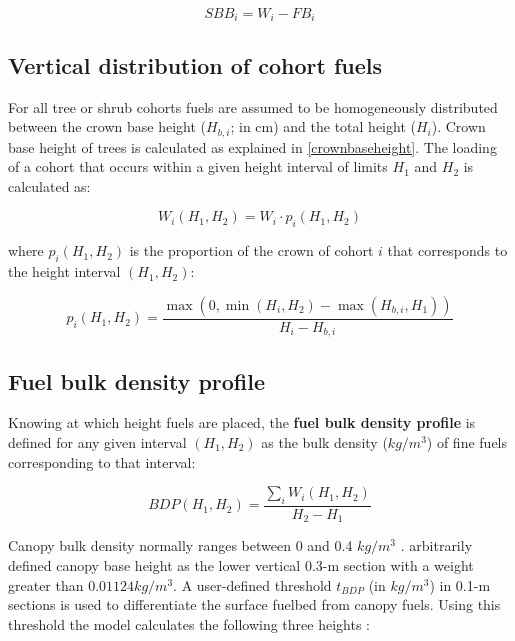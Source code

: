 \documentclass[]{book}
\begin{document}
\begin{equation}
SBB_{i} = W_{i} - FB_{i}
\end{equation}

\subsection{Vertical distribution of cohort
fuels}\label{vertical-distribution-of-cohort-fuels}

For all tree or shrub cohorts fuels are assumed to be homogeneously
distributed between the crown base height (\(H_{b,i}\); in cm) and the
total height (\(H_i\)). Crown base height of trees is calculated as
explained in \ref{crownbaseheight}. The loading of a cohort that occurs
within a given height interval of limits \(H_1\) and \(H_2\) is
calculated as:

\begin{equation}
W_i(H_1, H_2) = W_i\cdot p_i(H_1, H_2)
\end{equation}

where \(p_i(H_1, H_2)\) is the proportion of the crown of cohort \(i\)
that corresponds to the height interval \((H_1, H_2)\):

\begin{equation}
p_i(H_1, H_2) = \frac{\max(0, \min(H_i, H_2) - \max(H_{b,i}, H_1))}{H_{i}-H_{b,i}}
\end{equation}

\subsection{Fuel bulk density profile}\label{fuel-bulk-density-profile}

Knowing at which height fuels are placed, the \textbf{fuel bulk density
profile} \citep{Reinhardt2006} is defined for any given interval
\((H_1, H_2)\) as the bulk density (\(kg/m^3\)) of fine fuels
corresponding to that interval:

\begin{equation}
BDP(H_1, H_2) = \frac{\sum_{i} W_i(H_1, H_2)}{H_2-H_1}
\end{equation}

Canopy bulk density normally ranges between 0 and 0.4 \(kg/m^3\)
\citep{Scott2002}. \citet{Sando1972} arbitrarily defined canopy base
height as the lower vertical 0.3-m section with a weight greater than
\(0.01124 kg/m^3\). A user-defined threshold \(t_{BDP}\) (in \(kg/m^3\))
in 0.1-m sections is used to differentiate the surface fuelbed from
canopy fuels. Using this threshold the model calculates the following
three heights \citep{Reinhardt2006}:
\end{document}
